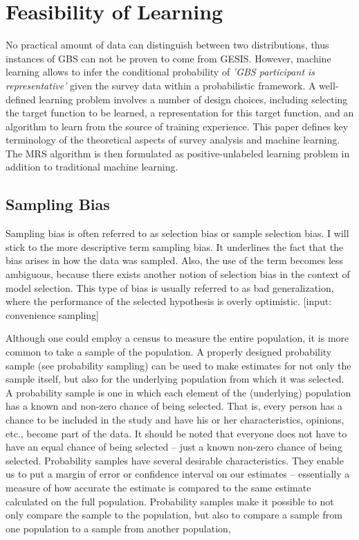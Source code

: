 \chapter{Feasibility of Learning}\label{Sec:Feasibility of Learning}

No practical amount of data can distinguish between two distributions, thus instances of GBS can not be proven to come from GESIS. However, machine learning allows to infer the conditional probability of \textit{'GBS participant is representative'} given the survey data within a probabilistic framework. A well-defined learning problem involves a number of design choices, including selecting the target function to be learned, a representation for this target function, and an algorithm to learn from the source of training experience. This paper defines key terminology of the theoretical aspects of survey analysis and machine learning. The MRS algorithm is then formulated as positive-unlabeled learning problem in addition to traditional machine learning.

\section{Sampling Bias}

Sampling bias is often referred to as selection bias or sample selection bias. I will stick to the more descriptive term sampling bias. It underlines the fact that the bias arises in how the data was sampled. Also, the use of the term becomes less ambiguous, because there exists another notion of selection bias in the context of model selection. This type of bias is usually referred to as bad generalization, where the performance of the selected hypothesis is overly optimistic. [input: convenience sampling]

Although one could employ a census to measure the entire population, it is more common to take a sample of the population. A properly designed probability sample (see probability sampling) can be used to make estimates for not only the sample itself, but also for the underlying population from which it was selected. A probability sample is one in which each element of the (underlying) population has a known and non-zero chance of being selected. That is, every person has a chance to be included in the study and have his or her characteristics, opinions, etc., become part of the data. It should be noted that everyone does not have to have an equal chance of being selected – just a known non-zero chance of being selected. 
Probability samples have several desirable characteristics. They enable us to put a margin of error or confidence interval on our estimates – essentially a measure of how accurate the estimate is compared to the same estimate calculated on the full population. Probability samples make it possible to not only compare the sample to the population, but also to compare a sample from one population to a sample from another population,


